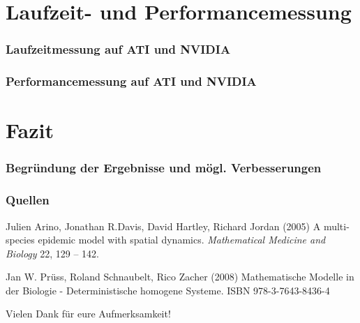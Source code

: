 \documentclass{beamer}
\begin{document}
\section{Laufzeit- und Performancemessung}
\begin{frame}
\frametitle{Laufzeitmessung auf ATI und NVIDIA}
\end{frame}

\begin{frame}
\frametitle{Performancemessung auf ATI und NVIDIA}
\end{frame}


\section{Fazit}
\begin{frame}
\frametitle{Begründung der Ergebnisse und m\"ogl. Verbesserungen}

 
\end{frame}














\begin{frame}
\frametitle{Quellen}
\footnotesize{
\begin{thebibliography}{99}
  Julien Arino, Jonathan R.Davis, David Hartley, Richard Jordan (2005)
 \newblock A multi-species epidemic model with spatial dynamics.
 \newblock \emph{Mathematical Medicine and Biology} 22, 129 -- 142.
\end{thebibliography}
}


\footnotesize{
\begin{thebibliography}{99}
  Jan W. Pr{\"u}ss,
 Roland Schnaubelt, Rico Zacher (2008)
 \newblock Mathematische Modelle
 in der Biologie - Deterministische homogene Systeme.
 \newblock ISBN 978-3-7643-8436-4
\end{thebibliography}
}


\end{frame}
 
 
 
\begin{frame}
\centerline{Vielen Dank f{\"u}r eure Aufmerksamkeit!}
\end{frame}
\end{document}

